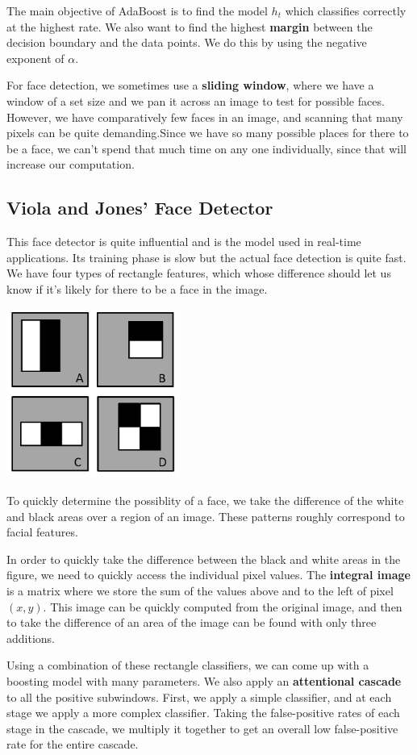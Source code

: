 \documentclass{tufte-handout}
\begin{document}
The main objective of AdaBoost is to find the model $h_{t}$ which classifies correctly 
at the highest rate. We also want to find the highest \textbf{margin} between the decision
boundary and the data points. We do this by using the negative exponent of $\alpha$.

For face detection, we sometimes use a \textbf{sliding window}, where we have a window of a 
set size and we pan it across an image to test for possible faces. However, we have comparatively
few faces in an image, and scanning that many pixels can be quite demanding.Since we have so 
many possible places for there to be a face, we can't spend that much time on any one 
individually, since that will increase our computation.

\subsection{Viola and Jones' Face Detector}
This face detector is quite influential and is the model used in real-time applications.
Its training phase is slow but the actual face detection is quite fast. We have four types
of rectangle features, which whose difference should let us know if it's likely for there 
to be a face in the image.
\begin{marginfigure}
		\includegraphics[scale=0.5]{rect_features}
		\caption{To quickly determine the possiblity of a face, we take the difference of the 
		white and black areas over a region of an image. These patterns roughly correspond
		to facial features.}
\end{marginfigure}

In order to quickly take the difference between the black and white areas in the figure,
we need to quickly access the individual pixel values. The \textbf{integral image} is 
a matrix where we store the sum of the  values above and to the left of pixel
$(x,y)$. This image can be quickly computed from the original image, and then to take the 
difference of an area of the image can be found with only three additions.

Using a combination of these rectangle classifiers, we can come up with a boosting model
with many parameters. We also apply an \textbf{attentional cascade} to all the positive 
subwindows. First, we apply a simple classifier, and at each stage we apply a more complex
classifier. Taking the false-positive rates of each stage in the cascade, we multiply it 
together to get an overall low false-positive rate for the entire cascade.
\end{document}
